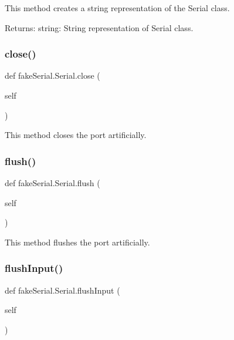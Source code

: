 \begin{DoxyVerb}This method creates a string representation of the Serial class.

Returns:
    string: String representation of Serial class.
\end{DoxyVerb}
 \mbox{\label{classfake_serial_1_1_serial_a183f0034571d103c4c90c041e6643557}} 
\subsubsection{\texorpdfstring{close()}{close()}}
{\footnotesize\ttfamily def fake\+Serial.\+Serial.\+close (\begin{DoxyParamCaption}\item[{}]{self }\end{DoxyParamCaption})}

\begin{DoxyVerb}This method closes the port artificially.
\end{DoxyVerb}
 \mbox{\label{classfake_serial_1_1_serial_a3c34cb0659b6d0dd5924ac79d79ad6bf}} 
\subsubsection{\texorpdfstring{flush()}{flush()}}
{\footnotesize\ttfamily def fake\+Serial.\+Serial.\+flush (\begin{DoxyParamCaption}\item[{}]{self }\end{DoxyParamCaption})}

\begin{DoxyVerb}This method flushes the port artificially.
\end{DoxyVerb}
 \mbox{\label{classfake_serial_1_1_serial_a6abb75597f64f245df8e0c7f62c7fde5}} 
\subsubsection{\texorpdfstring{flushInput()}{flushInput()}}
{\footnotesize\ttfamily def fake\+Serial.\+Serial.\+flush\+Input (\begin{DoxyParamCaption}\item[{}]{self }\end{DoxyParamCaption})}

